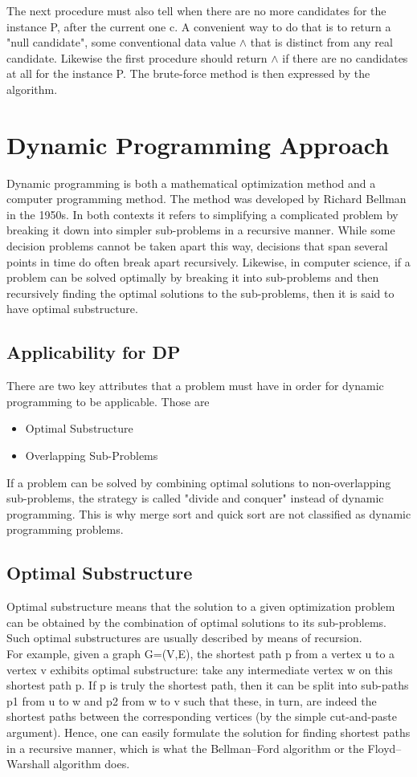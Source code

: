 \documentclass{report}
\begin{document}
    The next procedure must also tell when there are no more candidates for the instance P, after the current one c. A convenient way to do that is to return a "null candidate", some conventional data value $\land$ that is distinct from any real candidate. Likewise the first procedure should return $\land$ if there are no candidates at all for the instance P. The brute-force method is then expressed by the algorithm.
    
    
    
    \newpage
    \section{Dynamic Programming Approach}
    \bigskip
    Dynamic programming is both a mathematical optimization method and a computer programming method. The method was developed by Richard Bellman in the 1950s.
    In both contexts it refers to simplifying a complicated problem by breaking it down into simpler sub-problems in a recursive manner. While some decision problems cannot be taken apart this way, decisions that span several points in time do often break apart recursively. Likewise, in computer science, if a problem can be solved optimally by breaking it into sub-problems and then recursively finding the optimal solutions to the sub-problems, then it is said to have optimal substructure.
    \bigskip
    \subsection{Applicability for DP}
    There are two key attributes that a problem must have in order for dynamic programming to be applicable. Those are 
    \begin{itemize}
        \item {Optimal Substructure} 
        \item {Overlapping Sub-Problems}
    \end{itemize}
    If a problem can be solved by combining optimal solutions to non-overlapping sub-problems, the strategy is called "divide and conquer" instead of dynamic programming. This is why merge sort and quick sort are not classified as dynamic programming problems.
    
    \subsection{Optimal Substructure}
    Optimal substructure means that the solution to a given optimization problem can be obtained by the combination of optimal solutions to its sub-problems. Such optimal substructures are usually described by means of recursion.
    \\
    For example, given a graph G=(V,E), the shortest path p from a vertex u to a vertex v exhibits optimal substructure: take any intermediate vertex w on this shortest path p. If p is truly the shortest path, then it can be split into sub-paths p1 from u to w and p2 from w to v such that these, in turn, are indeed the shortest paths between the corresponding vertices (by the simple cut-and-paste argument). Hence, one can easily formulate the solution for finding shortest paths in a recursive manner, which is what the Bellman–Ford algorithm or the Floyd–Warshall algorithm does.
    \newpage
\end{document}
